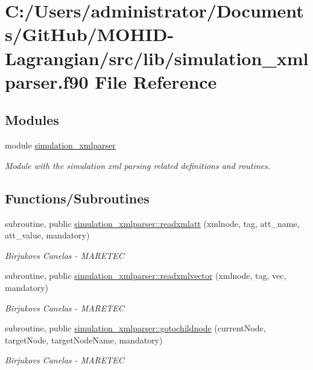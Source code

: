 \hypertarget{simulation__xmlparser_8f90}{}\section{C\+:/\+Users/administrator/\+Documents/\+Git\+Hub/\+M\+O\+H\+I\+D-\/\+Lagrangian/src/lib/simulation\+\_\+xmlparser.f90 File Reference}
\label{simulation__xmlparser_8f90}
\subsection*{Modules}
\begin{DoxyCompactItemize}
\item 
module \hyperlink{namespacesimulation__xmlparser}{simulation\+\_\+xmlparser}
\begin{DoxyCompactList}\small\item\em Module with the simulation xml parsing related definitions and routines. \end{DoxyCompactList}\end{DoxyCompactItemize}
\subsection*{Functions/\+Subroutines}
\begin{DoxyCompactItemize}
\item 
subroutine, public \hyperlink{namespacesimulation__xmlparser_ae5a51c63402f76781f333aead6d1084d}{simulation\+\_\+xmlparser\+::readxmlatt} (xmlnode, tag, att\+\_\+name, att\+\_\+value, mandatory)
\begin{DoxyCompactList}\small\item\em Birjukovs Canelas -\/ M\+A\+R\+E\+T\+EC \end{DoxyCompactList}\item 
subroutine, public \hyperlink{namespacesimulation__xmlparser_aa20b02586a497ea7ef90cb5b05cb2af7}{simulation\+\_\+xmlparser\+::readxmlvector} (xmlnode, tag, vec, mandatory)
\begin{DoxyCompactList}\small\item\em Birjukovs Canelas -\/ M\+A\+R\+E\+T\+EC \end{DoxyCompactList}\item 
subroutine, public \hyperlink{namespacesimulation__xmlparser_a9a66c3a491ca567688fef7148e2d12d8}{simulation\+\_\+xmlparser\+::gotochildnode} (current\+Node, target\+Node, target\+Node\+Name, mandatory)
\begin{DoxyCompactList}\small\item\em Birjukovs Canelas -\/ M\+A\+R\+E\+T\+EC \end{DoxyCompactList}\end{DoxyCompactItemize}

